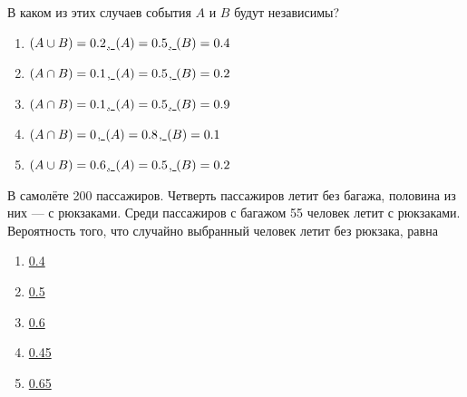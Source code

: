 \documentclass[t]{beamer}
\let\P\relax
\DeclareMathOperator{\P}{\mathbb{P}}
\begin{document}
 \begin{frame} \label{12} 
\begin{block}{12} 

В каком из этих случаев события $A$ и $B$ будут независимы?


 \end{block} 
\begin{enumerate} 
\item[] \hyperlink{12-No}{\beamergotobutton{}  $\P(A \cup B) = 0.2$, $\P (A) = 0.5$, $\P(B) = 0.4$ }
\item[] \hyperlink{12-Yes}{\beamergotobutton{}  $\P(A \cap B) = 0.1$, $\P (A) = 0.5$, $\P(B) = 0.2$ }
\item[] \hyperlink{12-No}{\beamergotobutton{}  $\P(A \cap B) = 0.1$, $\P (A) = 0.5$, $\P(B) = 0.9$ }
\item[] \hyperlink{12-No}{\beamergotobutton{}  $\P(A \cap B) = 0$, $\P (A) = 0.8$, $\P(B) = 0.1$ }
\item[] \hyperlink{12-No}{\beamergotobutton{}  $\P(A \cup B) = 0.6$, $\P (A) = 0.5$, $\P(B) = 0.2$ }
\end{enumerate} 
\end{frame} 


 \begin{frame} \label{13} 
\begin{block}{13} 

В самолёте 200 пассажиров. Четверть пассажиров летит без багажа, половина из них — с рюкзаками. Среди пассажиров с багажом 55 человек летит с рюкзаками. Вероятность того, что случайно выбранный человек летит без рюкзака, равна

  


 \end{block} 
\begin{enumerate} 
\item[] \hyperlink{13-No}{\beamergotobutton{}  0.4 }
\item[] \hyperlink{13-No}{\beamergotobutton{}  0.5 }
\item[] \hyperlink{13-Yes}{\beamergotobutton{}  0.6 }
\item[] \hyperlink{13-No}{\beamergotobutton{}  0.45 }
\item[] \hyperlink{13-No}{\beamergotobutton{}  0.65 }
\end{enumerate} 
\end{frame} 
\end{document}
